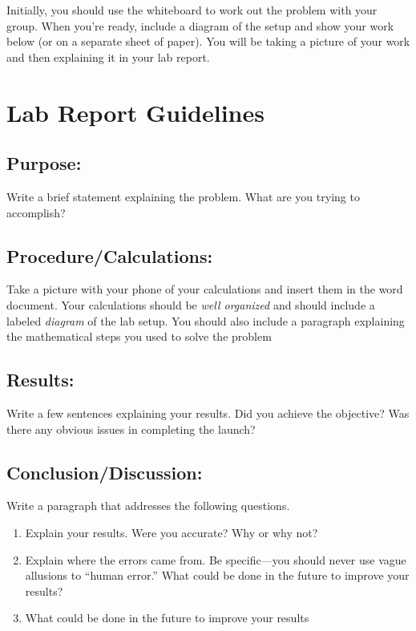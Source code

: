 \documentclass[10pt]{exam}
\begin{document}
Initially, you should use the whiteboard to work out the problem with your group.  When you're ready, include a diagram of the setup and show your work below (or on a separate sheet of paper).  You will be taking a picture of your work and then explaining it in your lab report.

\pagebreak


\section*{Lab Report Guidelines}

\subsection*{Purpose:}  
Write a brief statement explaining the problem.  What are you trying to accomplish?


\subsection*{Procedure/Calculations:}
Take a picture with your phone of your calculations and insert them in the word document.  Your calculations should be \emph{well organized} and should include a labeled \emph{diagram} of the lab setup.  You should also include a paragraph explaining the mathematical steps you used to solve the problem 

\subsection*{Results:}
Write a few sentences explaining your results.  Did you achieve the objective?  Was there any obvious issues in completing the launch?

\subsection*{Conclusion/Discussion:}
Write a paragraph that addresses the following questions.

\begin{enumerate}
  \item Explain your results. Were you accurate?  Why or why not? 
  \item Explain where the errors came from.  Be specific—you should never use vague allusions to ``human error.''  What could be done in the future to improve your results?
  \item What could be done in the future to improve your results
\end{enumerate}
	
\end{document}
